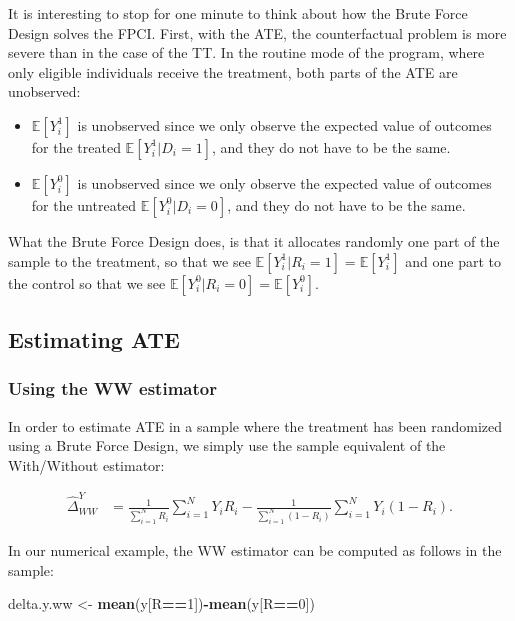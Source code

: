 \documentclass[]{book}
\newenvironment{Shaded}{\begin{snugshade}}{\end{snugshade}}
\newcommand{\KeywordTok}[1]{\textcolor[rgb]{0.13,0.29,0.53}{\textbf{#1}}}
\newcommand{\DecValTok}[1]{\textcolor[rgb]{0.00,0.00,0.81}{#1}}
\newcommand{\StringTok}[1]{\textcolor[rgb]{0.31,0.60,0.02}{#1}}
\newcommand{\OperatorTok}[1]{\textcolor[rgb]{0.81,0.36,0.00}{\textbf{#1}}}
\newcommand{\NormalTok}[1]{#1}
\providecommand{\tightlist}{%
  \setlength{\itemsep}{0pt}\setlength{\parskip}{0pt}}
\newcommand{\esp}[1]{\mathbb{E}[ #1 ]}
\theoremstyle{definition}
\theoremstyle{definition}
\theoremstyle{definition}
\theoremstyle{remark}
\let\BeginKnitrBlock\begin \let\EndKnitrBlock\end
\begin{document}
\BeginKnitrBlock{remark}
\iffalse{} {Remark. } \fi{}It is interesting to stop for one minute to
think about how the Brute Force Design solves the FPCI. First, with the
ATE, the counterfactual problem is more severe than in the case of the
TT. In the routine mode of the program, where only eligible individuals
receive the treatment, both parts of the ATE are unobserved:
\EndKnitrBlock{remark}

\begin{itemize}
\tightlist
\item
  \(\esp{Y_i^1}\) is unobserved since we only observe the expected value
  of outcomes for the treated \(\esp{Y_i^1|D_i=1}\), and they do not
  have to be the same.
\item
  \(\esp{Y_i^0}\) is unobserved since we only observe the expected value
  of outcomes for the untreated \(\esp{Y_i^0|D_i=0}\), and they do not
  have to be the same.
\end{itemize}

What the Brute Force Design does, is that it allocates randomly one part
of the sample to the treatment, so that we see
\(\esp{Y_i^1|R_i=1}=\esp{Y_i^1}\) and one part to the control so that we
see \(\esp{Y_i^0|R_i=0}=\esp{Y_i^0}\).

\subsection{Estimating ATE}\label{estimating-ate}

\subsubsection{Using the WW estimator}\label{using-the-ww-estimator}

In order to estimate ATE in a sample where the treatment has been
randomized using a Brute Force Design, we simply use the sample
equivalent of the With/Without estimator:

\begin{align*}
  \hat{\Delta}^Y_{WW} & = \frac{1}{\sum_{i=1}^N R_i}\sum_{i=1}^N Y_iR_i-\frac{1}{\sum_{i=1}^N (1-R_i)}\sum_{i=1}^N Y_i(1-R_i).
\end{align*}

\BeginKnitrBlock{example}
\protect\hypertarget{exm:unnamed-chunk-70}{}{\label{exm:unnamed-chunk-70}
}In our numerical example, the WW estimator can be computed as follows
in the sample:
\EndKnitrBlock{example}

\begin{Shaded}
\begin{Highlighting}[]
\NormalTok{delta.y.ww <-}\StringTok{ }\KeywordTok{mean}\NormalTok{(y[R}\OperatorTok{==}\DecValTok{1}\NormalTok{])}\OperatorTok{-}\KeywordTok{mean}\NormalTok{(y[R}\OperatorTok{==}\DecValTok{0}\NormalTok{])}
\end{Highlighting}
\end{Shaded}
\end{document}
